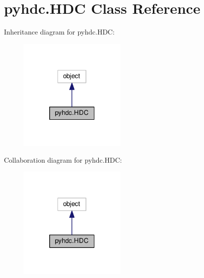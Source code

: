 \hypertarget{classpyhdc_1_1_h_d_c}{}\section{pyhdc.\+H\+DC Class Reference}
\label{classpyhdc_1_1_h_d_c}


Inheritance diagram for pyhdc.\+H\+DC\+:\nopagebreak
\begin{figure}[H]
\begin{center}
\leavevmode
\includegraphics[width=148pt]{classpyhdc_1_1_h_d_c__inherit__graph}
\end{center}
\end{figure}


Collaboration diagram for pyhdc.\+H\+DC\+:\nopagebreak
\begin{figure}[H]
\begin{center}
\leavevmode
\includegraphics[width=148pt]{classpyhdc_1_1_h_d_c__coll__graph}
\end{center}
\end{figure}

